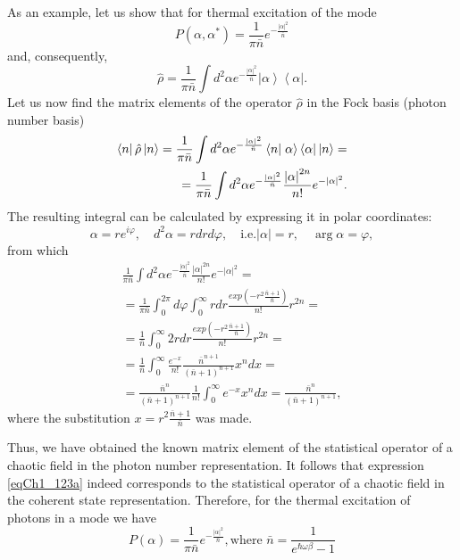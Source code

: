 As an example, let us show that for thermal excitation of the mode 
\begin{equation}
P\left(\alpha, \alpha^{*}\right) = \frac{1}{\pi \bar{n}}
e^{- \frac{\left|\alpha\right|^2}{\bar{n}}}
\label{eqCh1_123a}
\end{equation}
and, consequently,
\[
\hat{\rho} = \frac{1}{\pi \bar{n}}
\int d^2 \alpha 
e^{- \frac{\left|\alpha\right|^2}{\bar{n}}}
\left|\alpha\right>
\left<\alpha\right|.
\]
Let us now find the matrix elements of the operator $\hat{\rho}$ in
the Fock basis (photon number basis)
\begin{eqnarray}
\bra{n}
\hat{\rho}
\ket{n} = 
\frac{1}{\pi \bar{n}}
\int d^2 \alpha 
e^{- \frac{\left|\alpha\right|^2}{\bar{n}}}
\bra{n}\left.\alpha\right>
\left<\alpha\right|
\ket{n} = 
\nonumber \\
= 
\frac{1}{\pi \bar{n}}
\int d^2 \alpha 
e^{- \frac{\left|\alpha\right|^2}{\bar{n}}}
\frac{\left|\alpha\right|^{2n}}{n!} 
e^{- \left|\alpha\right|^2} .
\nonumber 
\end{eqnarray}
The resulting integral can be calculated by expressing it in polar coordinates:
\[
\alpha = r e^{i \varphi}, \quad 
d^2 \alpha = r d r d \varphi , \quad 
\text{i.e.} 
\left|\alpha\right| = r, \quad \arg \alpha = \varphi,
\]
from which
\begin{eqnarray}
\frac{1}{\pi \bar{n}}
\int d^2 \alpha 
e^{- \frac{\left|\alpha\right|^2}{\bar{n}}}
\frac{\left|\alpha\right|^{2n}}{n!} 
e^{- \left|\alpha\right|^2} =
\nonumber \\
=
\frac{1}{\pi \bar{n}}
\int_0^{2 \pi} d \varphi 
\int_0^{\infty}
r dr \frac{exp \left(- r^2\frac{\bar{n} + 1}{\bar{n}}\right)}{n!} r^{2n}= 
\nonumber \\
= 
\frac{1}{\bar{n}}
\int_0^{\infty}
2 r dr \frac{exp \left(- r^2\frac{\bar{n} + 1}{\bar{n}}\right)}{n!}  r^{2n} = 
\nonumber \\
= 
\frac{1}{\bar{n}}
\int_0^{\infty}
\frac{e^{-x}}{n!}\frac{\bar{n}^{n + 1}}
{\left(\bar{n} + 1\right)^{n + 1}}x^n dx = 
\nonumber \\
=
\frac{\bar{n}^{n}}
{\left(\bar{n} + 1\right)^{n + 1}}
\frac{1}{n!}
\int_0^{\infty}
e^{-x}x^n dx = 
\frac{\bar{n}^{n}}
{\left(\bar{n} + 1\right)^{n + 1}},
\label{eqCh1_matrelemRho}
\end{eqnarray}
where the substitution $x = r^2\frac{\bar{n} + 1}{\bar{n}}$ was made.

Thus, we have obtained the known matrix element
of the statistical operator of a chaotic field in the photon number representation. 
It follows that expression \eqref{eqCh1_123a}
indeed corresponds to the statistical operator of a chaotic field in
the coherent state representation. Therefore, for the thermal excitation of photons in a mode we have
\begin{equation}
P\left(\alpha\right) = \frac{1}{\pi \bar{n}}
e^{-\frac{\left|\alpha\right|^2}{\bar{n}}},
\mbox{where }
\bar{n} = \frac{1}{e^{\hbar \omega \beta} - 1}
\label{eqCh1_task4}
\end{equation}
  
